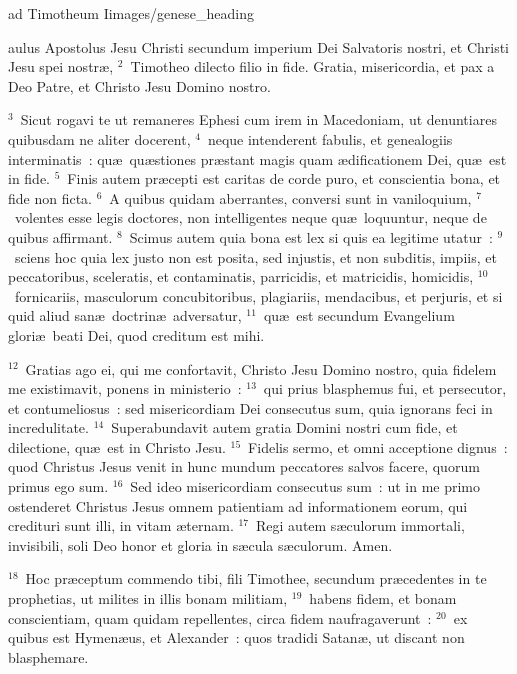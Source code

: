 {ad Timotheum I}{images/genese_heading}


\bchapter
{}aulus Apostolus Jesu Christi secundum imperium Dei Salvatoris nostri, et Christi Jesu spei nostr\ae ,
${}^{2}$~Timotheo dilecto filio in fide. Gratia, misericordia, et pax a Deo Patre, et Christo Jesu Domino nostro.


${}^{3}$~Sicut rogavi te ut remaneres Ephesi cum irem in Macedoniam, ut denuntiares quibusdam ne aliter docerent,
${}^{4}$~neque intenderent fabulis, et genealogiis interminatis~: qu\ae\ qu\ae stiones pr\ae stant magis quam \ae dificationem Dei, qu\ae\ est in fide.
${}^{5}$~Finis autem pr\ae cepti est caritas de corde puro, et conscientia bona, et fide non ficta.
${}^{6}$~A quibus quidam aberrantes, conversi sunt in vaniloquium,
${}^{7}$~volentes esse legis doctores, non intelligentes neque qu\ae\ loquuntur, neque de quibus affirmant.
${}^{8}$~Scimus autem quia bona est lex si quis ea legitime utatur~:
${}^{9}$~sciens hoc quia lex justo non est posita, sed injustis, et non subditis, impiis, et peccatoribus, sceleratis, et contaminatis, parricidis, et matricidis, homicidis,
${}^{10}$~fornicariis, masculorum concubitoribus, plagiariis, mendacibus, et perjuris, et si quid aliud san\ae\ doctrin\ae\ adversatur,
${}^{11}$~qu\ae\ est secundum Evangelium glori\ae\ beati Dei, quod creditum est mihi.


${}^{12}$~Gratias ago ei, qui me confortavit, Christo Jesu Domino nostro, quia fidelem me existimavit, ponens in ministerio~:
${}^{13}$~qui prius blasphemus fui, et persecutor, et contumeliosus~: sed misericordiam Dei consecutus sum, quia ignorans feci in incredulitate.
${}^{14}$~Superabundavit autem gratia Domini nostri cum fide, et dilectione, qu\ae\ est in Christo Jesu.
${}^{15}$~Fidelis sermo, et omni acceptione dignus~: quod Christus Jesus venit in hunc mundum peccatores salvos facere, quorum primus ego sum.
${}^{16}$~Sed ideo misericordiam consecutus sum~: ut in me primo ostenderet Christus Jesus omnem patientiam ad informationem eorum, qui credituri sunt illi, in vitam \ae ternam.
${}^{17}$~Regi autem s\ae culorum immortali, invisibili, soli Deo honor et gloria in s\ae cula s\ae culorum. Amen.


${}^{18}$~Hoc pr\ae ceptum commendo tibi, fili Timothee, secundum pr\ae cedentes in te prophetias, ut milites in illis bonam militiam,
${}^{19}$~habens fidem, et bonam conscientiam, quam quidam repellentes, circa fidem naufragaverunt~:
${}^{20}$~ex quibus est Hymen\ae us, et Alexander~: quos tradidi Satan\ae , ut discant non blasphemare.

